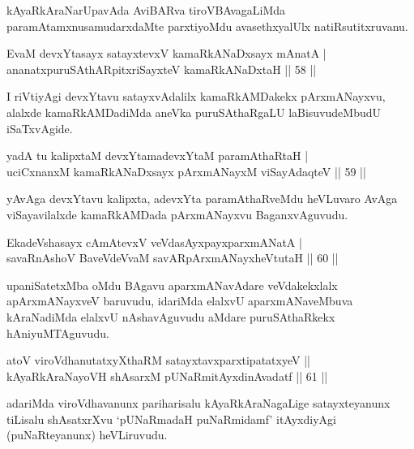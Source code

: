 \begin{artha}
kAyaRkAraNarUpavAda AviBARva tiroVBAvagaLiMda paramAtamxnu\break samudarxdaMte parxtiyoMdu avasethxyalUlx natiRsutitxruvanu.
\end{artha}

\begin{shl}
EvaM devxYtasayx satayxtevxV kamaRkANaDxsayx mAnatA  | \\
ananatxpuruSAthARpitxriSayxteV kamaRkANaDxtaH \hfill||  58 ||  
\end{shl}

\begin{artha}
I riVtiyAgi devxYtavu satayxvAdalilx kamaRkAMDakekx pArxmANayxvu, alalxde kamaRkAMDadiMda aneVka puruSAthaRgaLU laBisuvudeMbudU iSaTxvAgide.
\end{artha}

\begin{shl}
yadA tu kalipxtaM devxYtamadevxYtaM paramAthaRtaH  | \\
uciCxnanxM kamaRkANaDxsayx pArxmANayxM viSayAdaqteV  \hfill||  59 ||  
\end{shl}

\begin{artha}
yAvAga devxYtavu kalipxta, adevxYta paramAthaRveMdu heVLuvaro AvAga viSayavilalxde kamaRkAMDada pArxmANayxvu BaganxvAguvudu. 
\end{artha}

\begin{shl}
EkadeVshasayx cAmAtevxV veVdasAyxpayxparxmANatA  | \\
savaRnAshoV BaveVdeVvaM savARpArxmANayxheVtutaH \hfill||  60 ||  
\end{shl}

\begin{artha}
upaniSatetxMba oMdu BAgavu aparxmANavAdare veVdakekxlalx apArxmANayxveV baruvudu, idariMda elalxvU aparxmANaveMbuva kAraNadiMda elalxvU nAshavAguvudu aMdare puruSAthaRkekx hAniyuMTAguvudu.
\end{artha}

\begin{shl}
atoV viroVdhanutatxyXthaRM satayxtavxparxtipatatxyeV ||  \\
kAyaRkAraNayoVH shAsarxM pUNaRmitAyxdinA\s vadatf \hfill||  61 ||  
\end{shl}

\begin{artha}
adariMda viroVdhavanunx pariharisalu kAyaRkAraNagaLige satayxteyanunx tiLisalu shAsatxrXvu `pUNaRmadaH puNaRmidamf' itAyxdiyAgi (puNaRteyanunx) heVLiruvudu.
\end{artha}


